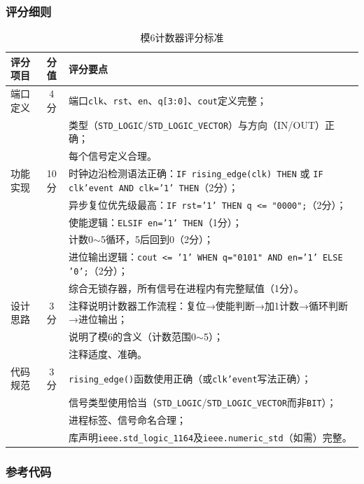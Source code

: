 \subsubsection*{评分细则}

\begin{table}[h!]
\centering
\caption{模6计数器评分标准}
\begin{tabular}{|l|c|p{10cm}|}
\hline
\textbf{评分项目} & \textbf{分值} & \textbf{评分要点} \\
\hline
端口定义 & 4分 &
端口\texttt{clk}、\texttt{rst}、\texttt{en}、\texttt{q[3:0]}、\texttt{cout}定义完整；\\
&&类型（\texttt{STD\_LOGIC}/\texttt{STD\_LOGIC\_VECTOR}）与方向（IN/OUT）正确；\\
&&每个信号定义合理。\\
\hline
功能实现 & 10分 &
时钟边沿检测语法正确：\texttt{IF rising\_edge(clk) THEN} 或 \texttt{IF clk'event AND clk='1' THEN}（2分）；\\
&&异步复位优先级最高：\texttt{IF rst='1' THEN q <= "0000";}（2分）；\\
&&使能逻辑：\texttt{ELSIF en='1' THEN}（1分）；\\
&&计数0$\sim$5循环，5后回到0（2分）；\\
&&进位输出逻辑：\texttt{cout <= '1' WHEN q="0101" AND en='1' ELSE '0';}（2分）；\\
&&综合无锁存器，所有信号在进程内有完整赋值（1分）。\\
\hline
设计思路 & 3分 &
注释说明计数器工作流程：复位→使能判断→加1计数→循环判断→进位输出；\\
&&说明了模6的含义（计数范围0$\sim$5）；\\
&&注释适度、准确。\\
\hline
代码规范 & 3分 &
\texttt{rising\_edge()}函数使用正确（或\texttt{clk'event}写法正确）；\\
&&信号类型使用恰当（\texttt{STD\_LOGIC}/\texttt{STD\_LOGIC\_VECTOR}而非\texttt{BIT}）；\\
&&进程标签、信号命名合理；\\
&&库声明\texttt{ieee.std\_logic\_1164}及\texttt{ieee.numeric\_std}（如需）完整。\\
\hline
\end{tabular}
\end{table}

\subsubsection*{参考代码}

